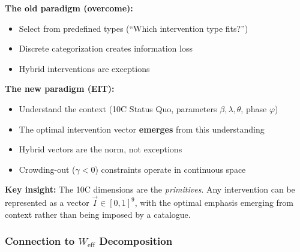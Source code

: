 \begin{tcolorbox}[colback=orange!5!white, colframe=orange!75!black,
    title=\textbf{Paradigm Shift: From Catalogue to Emergence}]

\textbf{The old paradigm (overcome):}
\begin{itemize}[nosep]
    \item Select from predefined types (``Which intervention type fits?'')
    \item Discrete categorization creates information loss
    \item Hybrid interventions are exceptions
\end{itemize}

\textbf{The new paradigm (EIT):}
\begin{itemize}[nosep]
    \item Understand the context (10C Status Quo, parameters $\beta, \lambda, \theta$, phase $\varphi$)
    \item The optimal intervention vector \textbf{emerges} from this understanding
    \item Hybrid vectors are the norm, not exceptions
    \item Crowding-out ($\gamma < 0$) constraints operate in continuous space
\end{itemize}

\textbf{Key insight:} The 10C dimensions are the \textit{primitives}. Any intervention can be represented as a vector $\vec{I} \in [0,1]^9$, with the optimal emphasis emerging from context rather than being imposed by a catalogue.
\end{tcolorbox}


\subsubsection{Connection to $W_{\text{eff}}$ Decomposition}

